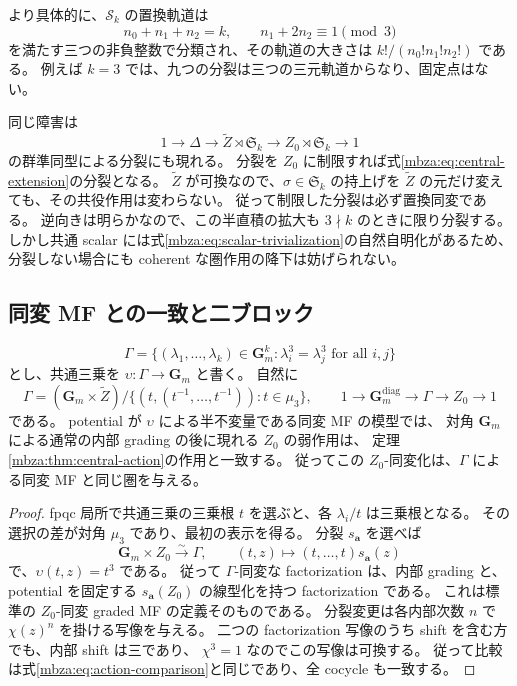 より具体的に、$\mathscr S_k$ の置換軌道は
\[
 n_0+n_1+n_2=k,\qquad n_1+2n_2\equiv1\pmod3
\]
を満たす三つの非負整数で分類され、その軌道の大きさは
$k!/(n_0!n_1!n_2!)$ である。
例えば $k=3$ では、九つの分裂は三つの三元軌道からなり、固定点はない。

\begin{remark}[半直積としての中心拡大]
同じ障害は
\[
 1\longrightarrow\Delta\longrightarrow
 \widetilde Z\rtimes\mathfrak S_k
 \longrightarrow Z_0\rtimes\mathfrak S_k\longrightarrow1
\]
の群準同型による分裂にも現れる。
分裂を $Z_0$ に制限すれば式\eqref{mbza:eq:central-extension}の分裂となる。
$\widetilde Z$ が可換なので、$\sigma\in\mathfrak S_k$ の持上げを
$\widetilde Z$ の元だけ変えても、その共役作用は変わらない。
従って制限した分裂は必ず置換同変である。
逆向きは明らかなので、この半直積の拡大も $3\nmid k$ のときに限り分裂する。
しかし共通 scalar には式\eqref{mbza:eq:scalar-trivialization}の自然自明化があるため、
分裂しない場合にも coherent な圏作用の降下は妨げられない。
\end{remark}

\subsection{同変 MF との一致と二ブロック}

\begin{proposition}
\label{mbza:prop:gamma-action}
\[
 \Gamma=\{(\lambda_1,\ldots,\lambda_k)\in\mathbf G_m^k:
                         \lambda_i^3=\lambda_j^3\text{ for all }i,j\}
\]
とし、共通三乗を $\upsilon:\Gamma\to\mathbf G_m$ と書く。
自然に
\[
 \Gamma=(\mathbf G_m\times\widetilde Z)/
   \{(t,(t^{-1},\ldots,t^{-1})):t\in\mu_3\},
 \qquad
 1\longrightarrow\mathbf G_m^{\mathrm{diag}}
       \longrightarrow\Gamma\longrightarrow Z_0\longrightarrow1
\]
である。
potential が $\upsilon$ による半不変量である同変 MF の模型では、
対角 $\mathbf G_m$ による通常の内部 grading の後に現れる $Z_0$ の弱作用は、
定理\ref{mbza:thm:central-action}の作用と一致する。
従ってこの $Z_0$-同変化は、$\Gamma$ による同変 MF と同じ圏を与える。
\end{proposition}
\begin{proof}
fpqc 局所で共通三乗の三乗根 $t$ を選ぶと、各 $\lambda_i/t$ は三乗根となる。
その選択の差が対角 $\mu_3$ であり、最初の表示を得る。
分裂 $s_{\boldsymbol a}$ を選べば
\[
 \mathbf G_m\times Z_0\xrightarrow{\sim}\Gamma,
 \qquad(t,z)\longmapsto(t,\ldots,t)s_{\boldsymbol a}(z)
\]
で、$\upsilon(t,z)=t^3$ である。
従って $\Gamma$-同変な factorization は、内部 grading と、
potential を固定する $s_{\boldsymbol a}(Z_0)$ の線型化を持つ factorization である。
これは標準の $Z_0$-同変 graded MF の定義そのものである。
分裂変更は各内部次数 $n$ で $\chi(z)^n$ を掛ける写像を与える。
二つの factorization 写像のうち shift を含む方でも、内部 shift は三であり、
$\chi^3=1$ なのでこの写像は可換する。
従って比較は式\eqref{mbza:eq:action-comparison}と同じであり、全 cocycle も一致する。
\end{proof}

